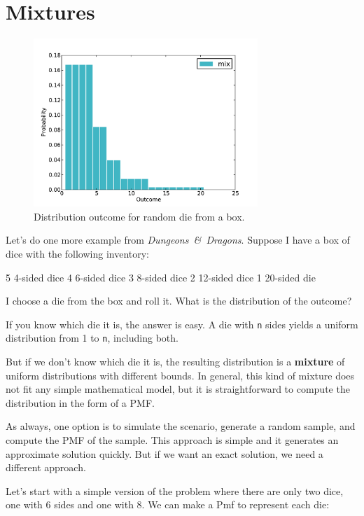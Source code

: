 \documentclass[12pt]{book}
\theoremstyle{exercise}
\begin{document}
\section{Mixtures}
\label{mixture}

\begin{figure}
\centerline{\includegraphics[height=2.5in]{figs/dungeons3.pdf}}
\caption{Distribution outcome for random die from a box.}
\label{fig.dungeons3}
\end{figure}

Let's do one more example from {\it Dungeons~\&~Dragons}.  Suppose
I have a box of dice with the following inventory:

\begin{code}
5   4-sided dice
4   6-sided dice
3   8-sided dice
2  12-sided dice
1  20-sided die
\end{code}

I choose a die from the box and roll it.  What is the distribution
of the outcome?

If you know which die it is, the answer is easy.  A die with {\tt n}
sides yields a uniform distribution from 1 to {\tt n}, including both.

But if we don't know which die it is, the resulting distribution is
a {\bf mixture} of uniform distributions with different bounds.
In general, this kind of mixture does not fit any simple mathematical
model, but it is straightforward to compute the distribution in
the form of a PMF.

As always, one option is to simulate the scenario, generate a random
sample, and compute the PMF of the sample.  This approach is simple
and it generates an approximate solution quickly.  But if we want an
exact solution, we need a different approach.

Let's start with a simple version of the problem where there are
only two dice, one with 6 sides and one with 8.  We can make a Pmf to
represent each die:
\end{document}
